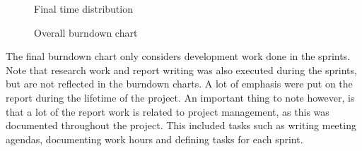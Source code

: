 \begin{center}
  \begin{figure}[ht!]
    \caption{Final time distribution}
    \label{fig:kake2}
  \end{figure}
\end{center}

\begin{center}
  \begin{figure}[ht!]
    \caption{Overall burndown chart}
    \label{fig:release-burndown}
  \end{figure}
\end{center}

The final burndown chart only considers development work done in the sprints. Note that research work and report writing was also executed during the sprints, but are not reflected in the burndown charts. A lot of emphasis were put on the report during the lifetime of the project. An important thing to note however, is that a lot of the report work is related to project management, as this was documented throughout the project. This included tasks such as writing meeting agendas, documenting work hours and defining tasks for each sprint.

